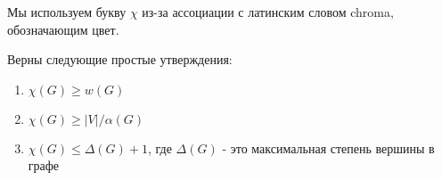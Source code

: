\begin{note}
	Мы используем букву $\chi$ из-за ассоциации с латинским словом chroma, обозначающим цвет.
\end{note}

\begin{exercise}
	Верны следующие простые утверждения:
	\begin{enumerate}
		\item \(\chi(G) \ge w(G)\)
		
		\item \(\chi(G) \ge |V| / \alpha(G)\)
		
		\item \(\chi(G) \le \Delta(G) + 1\), где $\Delta(G)$ - это максимальная степень вершины в графе
	\end{enumerate}
\end{exercise}